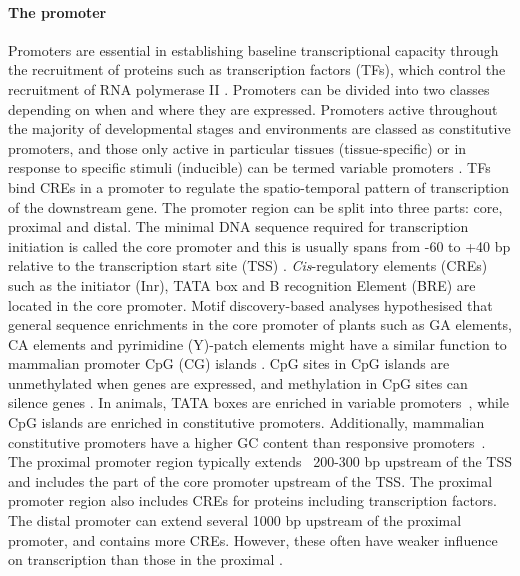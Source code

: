 \paragraph{The promoter}\label{The-promoter}
Promoters are essential in establishing baseline transcriptional capacity through the recruitment of proteins such as transcription factors (TFs), which control the recruitment of RNA polymerase II \autocite{portoPlantPromotersApproach2014}.
Promoters can be divided into two classes depending on when and where they are expressed.
Promoters active throughout the majority of developmental stages and environments are classed as constitutive promoters, and those only active in particular tissues (tissue\hyp{}specific) or in response to specific stimuli (inducible) can be termed variable promoters \autocite{bilasCisregulatoryElementsUsed2016}.
TFs bind CREs in a promoter to regulate the spatio\hyp{}temporal pattern of transcription of the downstream gene.
The promoter region can be split into three parts: core, proximal and distal.
The minimal DNA sequence required for transcription initiation is called the core promoter and this is usually spans from -60 to +40 bp relative to the transcription start site (TSS) \autocite{solovyevIdentificationPromoterRegions2010,royCorePromotersTranscription2015}.
\textit{Cis}\hyp{}regulatory elements (CREs) such as the initiator (Inr), TATA box and B recognition Element (BRE) are located in the core promoter.
Motif discovery\hyp{}based analyses hypothesised that general sequence enrichments in the core promoter of plants such as GA elements, CA elements and pyrimidine (Y)\hyp{}patch elements might have a similar function to mammalian promoter CpG (CG) islands \autocite{yamamotoCharacteristicsCorePromoter2011,yamamotoHeterogeneityArabidopsisCore2009}.
CpG sites in CpG islands are unmethylated when genes are expressed, and methylation in CpG sites can silence genes \autocite{birdDNAMethylationPatterns2002}.
In animals, TATA boxes are enriched in variable promoters~\autocite{engstromGenomicRegulatoryBlocks2007,carninciGenomewideAnalysisMammalian2006}, while CpG islands are enriched in constitutive promoters.
Additionally, mammalian constitutive promoters have a higher GC content than responsive promoters~\autocite{vinogradovDNAHelixImportance2017, weiCharacterizationGenePromoters2019}.
The proximal promoter region typically extends ~200\hyp{}300 bp upstream of the TSS and includes the part of the core promoter upstream of the TSS. The proximal promoter region also includes CREs for proteins including transcription factors.
The distal promoter can extend several 1000 bp upstream of the proximal promoter, and contains more CREs. However, these often have weaker influence on transcription than those in the proximal \autocite{pandiarajanVivoPromoterEngineering2018}.

